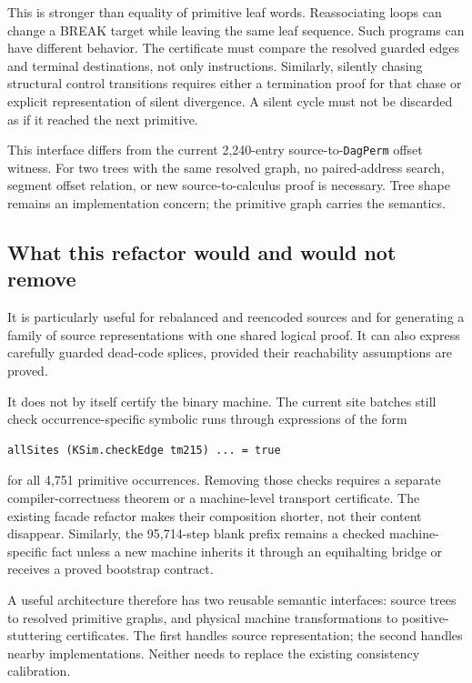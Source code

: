 \documentclass[11pt]{article}
\begin{document}
This is stronger than equality of primitive leaf words. Reassociating loops can change a BREAK target while leaving the same leaf sequence. Such programs can have different behavior. The certificate must compare the resolved guarded edges and terminal destinations, not only instructions. Similarly, silently chasing structural control transitions requires either a termination proof for that chase or explicit representation of silent divergence. A silent cycle must not be discarded as if it reached the next primitive.

This interface differs from the current 2,240-entry source-to-\texttt{DagPerm} offset witness. For two trees with the same resolved graph, no paired-address search, segment offset relation, or new source-to-calculus proof is necessary. Tree shape remains an implementation concern; the primitive graph carries the semantics.

\subsection{What this refactor would and would not remove}

It is particularly useful for rebalanced and reencoded sources and for generating a family of source representations with one shared logical proof. It can also express carefully guarded dead-code splices, provided their reachability assumptions are proved.

It does not by itself certify the binary machine. The current site batches still check occurrence-specific symbolic runs through expressions of the form
\begin{lstlisting}
allSites (KSim.checkEdge tm215) ... = true
\end{lstlisting}
for all 4,751 primitive occurrences. Removing those checks requires a separate compiler-correctness theorem or a machine-level transport certificate. The existing facade refactor makes their composition shorter, not their content disappear. Similarly, the 95,714-step blank prefix remains a checked machine-specific fact unless a new machine inherits it through an equihalting bridge or receives a proved bootstrap contract.

A useful architecture therefore has two reusable semantic interfaces: source trees to resolved primitive graphs, and physical machine transformations to positive-stuttering certificates. The first handles source representation; the second handles nearby implementations. Neither needs to replace the existing consistency calibration.
\end{document}
